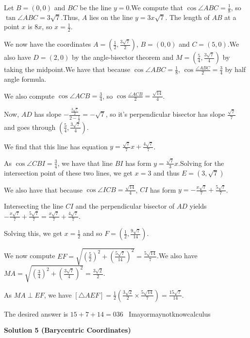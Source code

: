 \begin{enumerate}
 Let $B=(0,0)$ and $BC$ be the line $y=0$.We compute that $\cos{\angle{ABC}}=\frac{1}{8}$, so $\tan{\angle{ABC}}=3\sqrt{7}$.Thus, $A$ lies on the line $y=3x\sqrt{7}$. The length of $AB$ at a point $x$ is $8x$, so $x=\frac{1}{2}$.

 We now have the coordinates $A=\left(\frac{1}{2},\frac{3\sqrt{7}}{2}\right)$, $B=(0,0)$ and $C=(5,0)$.We also have $D=(2,0)$ by the angle-bisector theorem and $M=\left(\frac{5}{4},\frac{3\sqrt{7}}{4}\right)$ by taking the midpoint.We have that because $\cos{\angle{ABC}}=\frac{1}{8}$, $\cos{\frac{\angle{ABC}}{2}}=\frac{3}{4}$ by half angle formula.

 We also compute $\cos{\angle{ACB}}=\frac{3}{4}$, so $\cos{\frac{\angle{ACB}}{2}}=\frac{\sqrt{14}}{4}$.

 Now, $AD$ has slope $-\frac{\frac{3\sqrt{7}}{2}}{2-\frac{1}{2}}=-\sqrt{7}$, so it's perpendicular bisector has slope $\frac{\sqrt{7}}{7}$ and goes through $\left(\frac{5}{4},\frac{3\sqrt{7}}{4}\right)$.

 We find that this line has equation $y=\frac{\sqrt{7}}{7}x+\frac{4\sqrt{7}}{7}$.

 As $\cos{\angle{CBI}}=\frac{3}{4}$, we have that line $BI$ has form $y=\frac{\sqrt{7}}{3}x$.Solving for the intersection point of these two lines, we get $x=3$ and thus $E=\left(3, \sqrt{7}\right)$

 We also have that because $\cos{\angle{ICB}}=\frac{\sqrt{14}}{4}$, $CI$ has form $y=-\frac{x\sqrt{7}}{7}+\frac{5\sqrt{7}}{7}$.

 Intersecting the line $CI$ and the perpendicular bisector of $AD$ yields $-\frac{x\sqrt{7}}{7}+\frac{5\sqrt{7}}{7}=\frac{x\sqrt{7}}{7}+\frac{4\sqrt{7}}{7}$.

 Solving this, we get $x=\frac{1}{2}$ and so $F=\left(\frac{1}{2},\frac{9\sqrt{7}}{14}\right)$.

 We now compute $EF=\sqrt{\left(\frac{5}{2}\right)^2+\left(\frac{5\sqrt{7}}{14}\right)^2}=\frac{5\sqrt{14}}{7}$.We also have $MA=\sqrt{\left(\frac{3}{4}\right)^2+\left(\frac{3\sqrt{7}}{4}\right)^2}=\frac{3\sqrt{2}}{2}$.

 As ${MA}\perp{EF}$, we have $[\triangle{AEF}]=\frac{1}{2}\left(\frac{3\sqrt{2}}{2}\times\frac{5\sqrt{14}}{7}\right)=\frac{15\sqrt{7}}{14}$.

 
The desired answer is $15+7+14=\boxed{036}$ ~Imayormaynotknowcalculus

 



\textbf{Solution 5 (Barycentric Coordinates)}



\end{enumerate}
